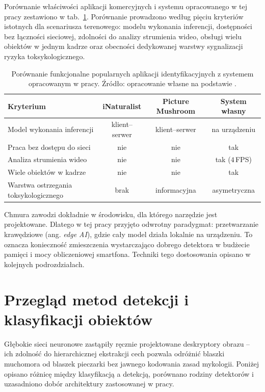 Porównanie właściwości aplikacji komercyjnych i systemu opracowanego w tej pracy zestawiono w tab.~\ref{tab:aplikacje_porownanie}. Porównanie prowadzono według pięciu kryteriów istotnych dla scenariusza terenowego: modelu wykonania inferencji, dostępności bez łączności sieciowej, zdolności do analizy strumienia wideo, obsługi wielu obiektów w jednym kadrze oraz obecności dedykowanej warstwy sygnalizacji ryzyka toksykologicznego.

\begin{table}[htbp]
 \centering
 \caption{Porównanie funkcjonalne popularnych aplikacji identyfikacyjnych z systemem opracowanym w pracy. Źródło: opracowanie własne na podstawie \cite{inaturalist, picturemushroom}.}
 \label{tab:aplikacje_porownanie}
 \begin{tabular}{|p{5.4cm}|c|c|c|}
 \hline
 \textbf{Kryterium} & \textbf{iNaturalist} & \textbf{Picture Mushroom} & \textbf{System własny} \\
 \hline \hline
 Model wykonania inferencji & klient--serwer & klient--serwer & na urządzeniu \\
 \hline
 Praca bez dostępu do sieci & nie & nie & tak \\
 \hline
 Analiza strumienia wideo & nie & nie & tak ($4$\,FPS) \\
 \hline
 Wiele obiektów w kadrze & nie & nie & tak \\
 \hline
 Warstwa ostrzegania toksykologicznego & brak & informacyjna & asymetryczna \\
 \hline
 \end{tabular}
\end{table}

Chmura zawodzi dokładnie w środowisku, dla którego narzędzie jest projektowane. Dlatego w tej pracy przyjęto odwrotny paradygmat: przetwarzanie krawędziowe (ang. \textit{edge AI}), gdzie cały model działa lokalnie na urządzeniu. To oznacza konieczność zmieszczenia wystarczająco dobrego detektora w budżecie pamięci i mocy obliczeniowej smartfona. Techniki tego dostosowania opisano w kolejnych podrozdziałach.

\section{Przegląd metod detekcji i klasyfikacji obiektów}
Głębokie sieci neuronowe zastąpiły ręcznie projektowane deskryptory obrazu – ich zdolność do hierarchicznej ekstrakcji cech pozwala odróżnić blaszki muchomora od blaszek pieczarki bez jawnego kodowania zasad mykologii. Poniżej opisano różnicę między klasyfikacją a detekcją, porównano rodziny detektorów i uzasadniono dobór architektury zastosowanej w pracy.

